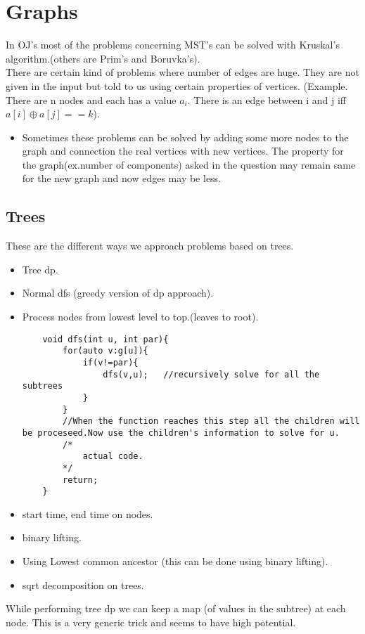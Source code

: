 \documentclass[../Notes.tex]{subfiles}
\begin{document}
\chapter{Graphs}

In OJ's most of the problems concerning MST's can be solved with Kruskal's algorithm.(others are Prim's and Boruvka's).\\ 

There are certain kind of problems where number of edges are huge. They are not given in the input but told to us using certain properties of vertices. (Example. There are n nodes and each has a value $a_{i}$. There is an edge between i and j iff $a[i]\oplus a[j]==k$).
\begin{itemize}
	\item Sometimes these problems can be solved by adding some more nodes to the graph and connection the real vertices with new vertices. The property for the graph(ex.number of components) asked in the question may remain same for the new graph and now edges may be less.
\end{itemize}

\section{Trees}

These are the different ways we approach problems based on trees.
\begin{itemize}
	\item Tree dp.
	\item Normal dfs (greedy version of dp approach).
	\item Process nodes from lowest level to top.(leaves to root).
	\pagebreak
	\begin{lstlisting}
	void dfs(int u, int par){
		for(auto v:g[u]){
			if(v!=par){
				dfs(v,u);	//recursively solve for all the subtrees
			}
		}
		//When the function reaches this step all the children will be proceseed.Now use the children's information to solve for u.
		/*
			actual code.
		*/
		return;
	}
	\end{lstlisting}
	\item start time, end time on nodes.
	\item binary lifting.
	\item Using Lowest common ancestor (this can be done using binary lifting).
	\item sqrt decomposition on trees.
\end{itemize}

While performing tree dp we can keep a map (of values in the subtree) at each node. This is a very generic trick and seems to have high potential.
\end{document}
